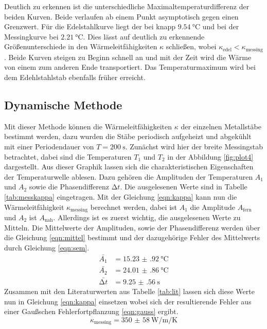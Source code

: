 Deutlich zu erkennen ist die unterschiedliche Maximaltemperaturdifferenz der beiden Kurven. Beide verlaufen ab einem Punkt asymptotisch gegen einen Grenzwert. Für die Edelstahlkurve liegt der bei knapp $\SI{9.54}{\celsius}$ und bei der 
Messingkurve bei $\SI{2.21}{\celsius}$. Dies lässt auf deutlich zu erkennende Größenunterschiede in den Wärmeleitfähigkeiten $\kappa$ schließen, wobei $\kappa_{\text{edel}} < \kappa_{\text{messing}}$. Beide Kurven steigen zu
Beginn schnell an und mit der Zeit wird die Wärme von einem zum anderen Ende transportiert. Das Temperaturmaximum wird bei dem Edehlstahlstab ebenfalls früher erreicht.

\subsection{Dynamische Methode}
Mit dieser Methode können die Wärmeleitfähigkeiten $\kappa$ der einzelnen Metallstäbe bestimmt werden, dazu wurden die Stäbe periodisch aufgeheizt und abgekühlt mit einer Periodendauer von $T = \SI{200}{\second}$.
Zunächst wird hier der breite Messingstab betrachtet, dabei sind die Temperaturen $T_{1}$ und $T_{2}$ in der Abbildung \ref{fig:plot4} dargestellt. Aus dieser Graphik lassen sich die charakteristischen Eigenschaften der Temperaturwelle
ablesen. Dazu gehören die Amplituden der Temperaturen $A_{1}$ und $A_{2}$ sowie die Phasendifferenz $\increment t$.
Die ausgelesenen Werte sind in Tabelle \ref{tab:messkappa} eingetragen. Mit der Gleichung \ref{eqn:kappa}
kann nun die Wärmeleitfähigkeit $\kappa_{\text{messing}}$ berechnet werden, dabei ist $A_{1}$ die Amplitude $A_{\text{fern}}$ und  $A_{2}$ ist $A_{\text{nah}}$.
Allerdings ist es zuerst wichtig, die ausgelesenen Werte zu Mitteln. Die Mittelwerte der Amplituden, sowie der Phasendifferenz werden über die Gleichung \ref{eqn:mittel} bestimmt und der dazugehörige Fehler des Mittelwerts durch
Gleichung \ref{eqn:sem}.
\begin{align}
\bar{A_{1}} &= \SI{15.23(92)}{\celsius}      \\
\bar{A_{2}} &=  \SI{24.01(86)}{\celsius}        \\
\bar{\increment t} &= \SI{9.25(56)}{\second}
\end{align}
Zusammen mit den Literaturwerten aus Tabelle \ref{tab:lit} lassen sich diese Werte nun in Gleichung \ref{eqn:kappa} einsetzen wobei sich der resultierende Fehler aus einer Gaußschen Fehlerfortpflanzung \ref{eqn:gauss} ergibt.
\begin{equation}
\kappa_{\text{messing}} = \SI{350(58)}{\watt\per\meter\per\kelvin}
\end{equation}
